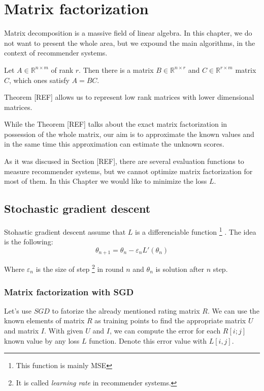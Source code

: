 
\chapter{Matrix factorization}
Matrix decomposition is a massive field of linear algebra. In this chapter, we do
not want to present the whole area, but we expound the main algorithms, in the
context of recommender systems.

\begin{theo}
  Let $A\in \mathbb{R}^{n\times m}$ of rank $r$. Then there is a matrix
  $B\in \mathbb{R}^{n\times r}$ and $C\in \mathbb{R}^{r\times m}$
  matrix $C$, which ones satisfy $A=BC$.
\end{theo}

Theorem [REF] allows us to represent low rank matrices with lower dimensional
matrices.

While the Theorem [REF] talks about the exact matrix factorization in possession
of the whole matrix, our aim is to approximate the known values and in the same
time this approximation can estimate the unknown scores.

As it was discused in Section [REF], there are several evaluation functions to
measure recommender systems, but we cannot optimize matrix factorization for most
of them. In this Chapter we would like to minimize the loss $L$.

\section{Stochastic gradient descent}
Stohastic gradient descent assume that $L$ is a differenciable function \footnote{
This function is mainly MSE}  . The idea is the following:
\[ \theta_{n+1}=\theta_n - \varepsilon_n L'(\theta_n) \]

Where $\varepsilon_n$ is the size of step \footnote{It is called \emph{learning rate}
  in recommender systems.} in round $n$ and $\theta_{n}$ is solution after $n$ step.

\subsection{Matrix factorization with SGD}
Let's use $SGD$ to fatorize the already mentioned rating matrix $R$. We can use the
known elements of matrix $R$ as training points to find the appropriate matrix $U$ and
matrix $I$. With given $U$ and $I$, we can compute the error for each $R[i;j]$ known
value by any loss $L$ function. Denote this error value with $L[i,j]$.

